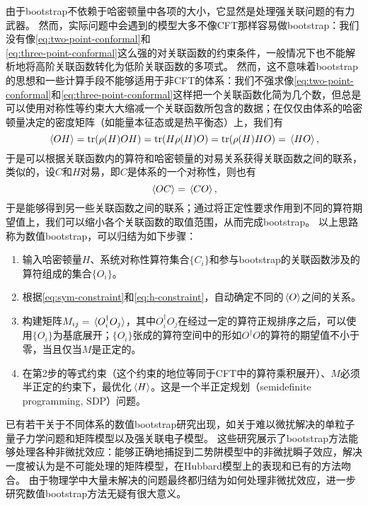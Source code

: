 \documentclass[hyperref, UTF8, a4paper]{ctexart}
\begin{document}
由于bootstrap不依赖于哈密顿量中各项的大小，它显然是处理强关联问题的有力武器。
然而，实际问题中会遇到的模型大多不像CFT那样容易做bootstrap：我们没有像\eqref{eq:two-point-conformal}和\\
\eqref{eq:three-point-conformal}这么强的对关联函数的约束条件，一般情况下也不能解析地将高阶关联函数转化为低阶关联函数的多项式。
然而，这不意味着bootstrap的思想和一些计算手段不能够适用于非CFT的体系：我们不强求像\eqref{eq:two-point-conformal}和\eqref{eq:three-point-conformal}这样把一个关联函数化简为几个数，但总是可以使用对称性等约束大大缩减一个关联函数所包含的数据；在仅仅由体系的哈密顿量决定的密度矩阵（如能量本征态或是热平衡态）上，我们有
\begin{equation}
    \expval*{O H} = \trace (\rho(H) O H) = \trace(H \rho(H) O) = \trace(\rho(H) H O)  = \expval*{H {O}},
    \label{eq:h-constraint}
\end{equation}
于是可以根据关联函数内的算符和哈密顿量的对易关系获得关联函数之间的联系，类似的，设$C$和$H$对易，即$C$是体系的一个对称性，则也有
\begin{equation}
    \expval*{O C} = \expval*{C {O}},
    \label{eq:sym-constraint}
\end{equation}
于是能够得到另一些关联函数之间的联系；通过将正定性要求作用到不同的算符期望值上，我们可以缩小各个关联函数的取值范围，从而完成bootstrap。
以上思路称为数值bootstrap，可以归结为如下步骤：
\begin{enumerate}
  \item 输入哈密顿量$H$、系统对称性算符集合$\{C_i\}$和参与bootstrap的关联函数涉及的算符组成的集合$\{O_i\}$。
  \item 根据\eqref{eq:sym-constraint}和\eqref{eq:h-constraint}，自动确定不同的$\expval*{O}$之间的关系。
  \item 构建矩阵$M_{ij} = \expval*{O_i^\dagger O_j}$，其中$O_i^\dagger O_j$在经过一定的算符正规排序之后，可以使用$\{O_i\}$为基底展开；$\{O_i\}$张成的算符空间中的形如$O^\dagger O$的算符的期望值不小于零，当且仅当$M$是正定的。
  \item 在第2步的等式约束（这个约束的地位等同于CFT中的算符乘积展开）、$M$必须半正定的约束下，最优化$\expval*{H}$。这是一个半正定规划（semidefinite programming, SDP）问题。
\end{enumerate}

已有若干关于不同体系的数值bootstrap研究出现，如关于难以微扰解决的单粒子量子力学问题和矩阵模型\cite{han_matrix,bhattacharya2021,kazakov2021analytic}以及强关联电子模型\cite{han_manybody}。
这些研究展示了bootstrap方法能够处理各种非微扰效应：能够正确地捕捉到二势阱模型中的非微扰瞬子效应\cite{bhattacharya2021}，解决一度被认为是不可能处理的矩阵模型\cite{kazakov2021analytic}，在Hubbard模型上的表现和已有的方法吻合\cite{han_manybody}。
由于物理学中大量未解决的问题最终都归结为如何处理非微扰效应，进一步研究数值bootstrap方法无疑有很大意义。
\end{document}
